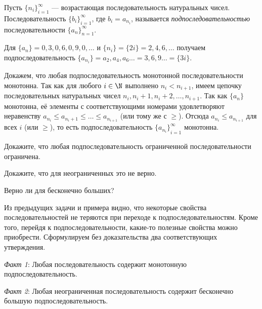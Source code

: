 \documentclass[a4paper, 12pt, num=2426, date=01.09.2020]{listok}
\begin{document}
\begin{definition}
    Пусть ${\{n_i\}}_{i=1}^{\infty}$ --- возрастающая последовательность натуральных чисел.
    Последовательность ${\{b_i\}}_{i=1}^{\infty}$, где $b_i = a_{n_i}$, называется \textit{подпоследовательностью} последовательности ${\{a_n\}}_{n=1}^{\infty}$.
\end{definition}

\begin{example*}
    Для $\{a_n\} = 0, 3, 0, 6, 0, 9, 0,\ldots$ и $\{n_i\} = \{2i\} = 2, 4, 6, \ldots$ получаем подпоследовательность $\{a_{n_i}\} = a_2, a_4, a_6\ldots = 3, 6, 9\ldots = \{3i\}$.
\end{example*}

\begin{example*}
    Докажем, что любая подпоследовательность монотонной последовательности монотонна.
    Так как для любого $i \in \N$ выполнено $n_i < n_{i+1}$, имеем цепочку последовательных натуральных чисел $n_i, n_i + 1, n_i + 2, \ldots, n_{i+1}$.
    Так как $\{a_n\}$ монотонна, её элементы с соответствующими номерами удовлетворяют неравенству $a_{n_i} \le a_{n_i + 1} \le \ldots \le a_{n_{i+1}}$ (или тому же с $\ge$).
    Отсюда $a_{n_i} \le a_{n_{i+1}}$ для всех $i$ (или $\ge$), то есть подпоследовательность ${\{a_{n_i}\}}_{i = 1}^{\infty}$ монотонна.
\end{example*}

\begin{problem}
\begin{probparts}
    \item Докажите, что любая подпоследовательность ограниченной последовательности ограничена.
    \item Докажите, что для неограниченных это не верно.
    \item Верно ли для бесконечно больших?
\end{probparts}
\end{problem}

\noindent Из предыдущих задачи и примера видно, что некоторые свойства последовательностей не теряются при переходе к подпоследовательностям. Кроме того, перейдя к подпоследовательности, какие-то полезные свойства можно приобрести.  Сформулируем без доказательства два соответствующих утверждения.

\emph{Факт 1}: Любая последовательность содержит монотонную подпоследовательность.

\emph{Факт 2}: Любая неограниченная последовательность содержит бесконечно большую подпоследовательность.
\end{document}

